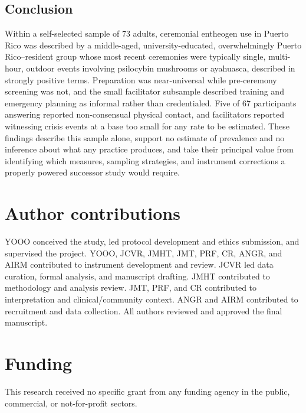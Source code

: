 \documentclass[12pt]{article}
\begin{document}
\subsection{Conclusion}

Within a self-selected sample of 73 adults, ceremonial entheogen use in Puerto Rico was described by a
middle-aged, university-educated, overwhelmingly Puerto Rico--resident group whose most recent ceremonies
were typically single, multi-hour, outdoor events involving psilocybin mushrooms or ayahuasca, described in
strongly positive terms. Preparation was near-universal while pre-ceremony screening was not, and the small
facilitator subsample described training and emergency planning as informal rather than credentialed. Five
of 67 participants answering reported non-consensual physical contact, and facilitators reported witnessing
crisis events at a base too small for any rate to be estimated. These findings describe this sample alone,
support no estimate of prevalence and no inference about what any practice produces, and take their
principal value from identifying which measures, sampling strategies, and instrument corrections a properly
powered successor study would require.

\section*{Author contributions}
YOOO conceived the study, led protocol development and ethics submission, and supervised the project.
YOOO, JCVR, JMHT, JMT, PRF, CR, ANGR, and AIRM contributed to instrument development and review. JCVR led
data curation, formal analysis, and manuscript drafting. JMHT contributed to methodology and analysis
review. JMT, PRF, and CR contributed to interpretation and clinical/community context. ANGR and AIRM
contributed to recruitment and data collection. All authors reviewed and approved the final manuscript.

\section*{Funding}
This research received no specific grant from any funding agency in the public, commercial, or
not-for-profit sectors.
\end{document}
